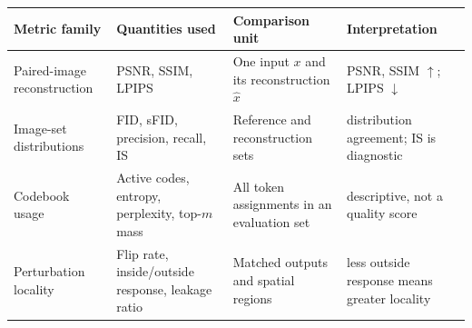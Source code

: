 \begingroup
\scriptsize
\renewcommand{\arraystretch}{1.16}
\setlength{\tabcolsep}{3.5pt}
\begin{tabularx}{\textwidth}{>{\raggedright\arraybackslash}p{} >{\raggedright\arraybackslash}p{} >{\raggedright\arraybackslash}p{} >{\centering\arraybackslash}X}
\rowcolor{blue!9}
\textbf{Metric family} & \textbf{Quantities used} & \textbf{Comparison unit} & \textbf{Interpretation} \\ \hline
Paired-image reconstruction & PSNR, SSIM, LPIPS & One input $x$ and its reconstruction $\hat{x}$ & PSNR, SSIM $\uparrow$; LPIPS $\downarrow$ \\
Image-set distributions & FID, sFID, precision, recall, IS & Reference and reconstruction sets & distribution agreement; IS is diagnostic \\
Codebook usage & Active codes, entropy, perplexity, top-$m$ mass & All token assignments in an evaluation set & descriptive, not a quality score \\
Perturbation locality & Flip rate, inside/outside response, leakage ratio & Matched outputs and spatial regions & less outside response means greater locality \\
\end{tabularx}
\endgroup
